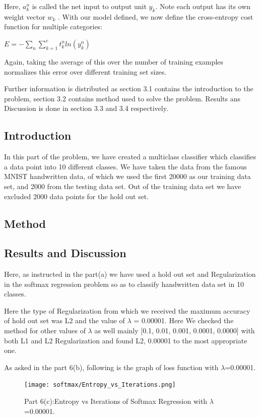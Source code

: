 \documentclass{article} %
\begin{document}
Here, $a_{k}^n$ is called the net input to output unit $y_k$. Note each output has its own weight vector $w_k$ . With our model defined, we now define the cross-entropy cost function for multiple categories:
\begin{center}
$E = −\sum_n \sum_{k=1}^{c} t^n_k ln(y_k^n)$
\end{center}

Again, taking the average of this over the number of training examples normalizes this error over different training set sizes.

Further information is distributed as section 3.1 contains the introduction to the problem, section 3.2 contains method used to solve the problem. Results ans Discussion is done in section 3.3 and 3.4 respectively.\\ 
\subsection{Introduction}
In this part of the problem, we have created a multiclass classifier which classifies a data point into 10 different classes. We have taken the data from the famous MNIST handwritten data, of which we used the first 20000 as our training data set, and 2000 from the testing data set. Out of the training data set we have excluded 2000 data points for the hold out set.\\
\subsection{Method}
\subsection{Results and Discussion}

Here, as instructed in the part(a) we have used a hold out set and Regularization in the softmax regression problem so as to classify handwritten data set in 10 classes.

Here the type of Regularization from which we received the maximum accuracy of hold out set was L2 and the value of $\lambda$ = 0.00001. Here We checked the method for other values of $\lambda$ as well mainly [0.1, 0.01, 0.001, 0.0001, 0.0000] with both L1 and L2 Regularization and found L2, 0.00001 to the most appropriate one.

As asked in the part 6(b), following is the graph of loss function with $\lambda$=0.00001.
\begin{figure}[h]
\begin{center}
\texttt{[image: softmax/Entropy\_vs\_Iterations.png]}
\end{center}
\caption{Part 6(c):Entropy vs Iterations of Softmax Regression with $\lambda$=0.00001.}
\end{figure}
\end{document}

